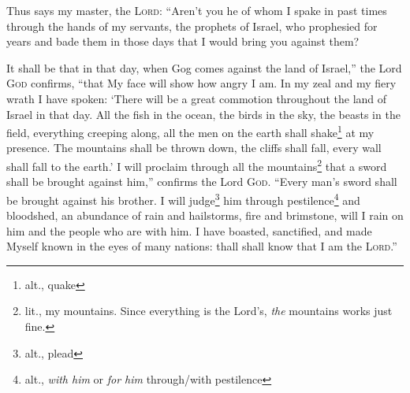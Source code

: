 
\begin{inparaenum}
    
    
    
     Thus says my master, the \textsc{Lord}: ``Aren't you he of whom I spake in past times through the hands of my servants, the prophets of Israel, who prophesied for years and bade them in those days that I would bring you against them?%
    
     It shall be that in that day, when Gog comes against the land of Israel,'' the Lord \textsc{God} confirms, ``that My face will show how angry I am.%
     In my zeal and my fiery wrath I have spoken: `There will be a great commotion throughout the land of Israel in that day.%
     All the fish in the ocean, the birds in the sky, the beasts in the field, everything creeping along, all the men on the earth shall shake\footnote{alt., quake} at my presence. The mountains shall be thrown down, the cliffs shall fall, every wall shall fall to the earth.'%
     I will proclaim through all the mountains\footnote{lit., my mountains. Since everything is the Lord's, \textit{the} mountains works just fine.} that a sword shall be brought against him,'' confirms the Lord \textsc{God}. ``Every man's sword shall be brought against his brother.%
     I will judge\footnote{alt., plead} him through pestilence\footnote{alt., \textit{with him} or \textit{for him} through/with pestilence} and bloodshed, an abundance of rain and hailstorms, fire and brimstone, will I rain on him and the people who are with him.%
     I have boasted, sanctified, and made Myself known in the eyes of many nations: thall shall know that I am the \textsc{Lord}.''%
\end{inparaenum}
